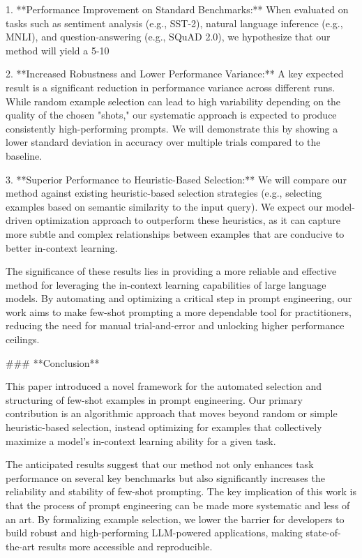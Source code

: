 \documentclass{article}
\begin{document}
1.  **Performance Improvement on Standard Benchmarks:** When evaluated on tasks such as sentiment analysis (e.g., SST-2), natural language inference (e.g., MNLI), and question-answering (e.g., SQuAD 2.0), we hypothesize that our method will yield a 5-10%

2.  **Increased Robustness and Lower Performance Variance:** A key expected result is a significant reduction in performance variance across different runs. While random example selection can lead to high variability depending on the quality of the chosen "shots," our systematic approach is expected to produce consistently high-performing prompts. We will demonstrate this by showing a lower standard deviation in accuracy over multiple trials compared to the baseline.

3.  **Superior Performance to Heuristic-Based Selection:** We will compare our method against existing heuristic-based selection strategies (e.g., selecting examples based on semantic similarity to the input query). We expect our model-driven optimization approach to outperform these heuristics, as it can capture more subtle and complex relationships between examples that are conducive to better in-context learning.

The significance of these results lies in providing a more reliable and effective method for leveraging the in-context learning capabilities of large language models. By automating and optimizing a critical step in prompt engineering, our work aims to make few-shot prompting a more dependable tool for practitioners, reducing the need for manual trial-and-error and unlocking higher performance ceilings.

### **Conclusion**

This paper introduced a novel framework for the automated selection and structuring of few-shot examples in prompt engineering. Our primary contribution is an algorithmic approach that moves beyond random or simple heuristic-based selection, instead optimizing for examples that collectively maximize a model's in-context learning ability for a given task.

The anticipated results suggest that our method not only enhances task performance on several key benchmarks but also significantly increases the reliability and stability of few-shot prompting. The key implication of this work is that the process of prompt engineering can be made more systematic and less of an art. By formalizing example selection, we lower the barrier for developers to build robust and high-performing LLM-powered applications, making state-of-the-art results more accessible and reproducible.
\end{document}
